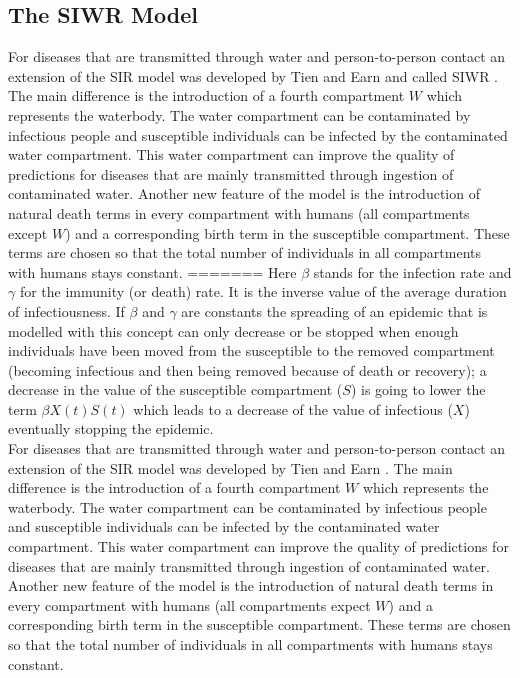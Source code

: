 \documentclass[11pt]{article}
\begin{document}
\subsection{The SIWR Model}
For diseases that are transmitted through water and person-to-person contact an extension of the SIR model was developed by Tien and Earn and called SIWR \cite{tien:2010}. The main difference is the introduction of a fourth compartment $ W $ which represents the waterbody. The water compartment can be contaminated by infectious people and susceptible individuals can be infected by the contaminated water compartment. This water compartment can improve the quality of predictions for diseases that are mainly transmitted through ingestion of contaminated water. Another new feature of the model is the introduction of natural death terms in every compartment with humans (all compartments except $ W $) and a corresponding birth term in the susceptible compartment. These terms are chosen so that the total number of individuals in all compartments with humans stays constant.
=======
Here $\beta$ stands for the infection rate and $\gamma$ for the immunity (or death) rate. It is the inverse value of the average duration of infectiousness. If $\beta$ and $\gamma$ are constants the spreading of an epidemic that is modelled with this concept can only decrease or be stopped when enough individuals have been moved from the susceptible to the removed compartment (becoming infectious and then being removed because of death or recovery); a decrease in the value of the susceptible compartment ($ S $) is going to lower the term $\beta X(t)S(t)$ which leads to a decrease of the value of infectious ($ X $) eventually stopping the epidemic.\\
For diseases that are transmitted through water and person-to-person contact an extension of the SIR model was developed by Tien and Earn \cite{tien:2010}. The main difference is the introduction of a fourth compartment $ W $ which represents the waterbody. The water compartment can be contaminated by infectious people and susceptible individuals can be infected by the contaminated water compartment. This water compartment can improve the quality of predictions for diseases that are mainly transmitted through ingestion of contaminated water. Another new feature of the model is the introduction of natural death terms in every compartment with humans (all compartments expect $ W $) and a corresponding birth term in the susceptible compartment. These terms are chosen so that the total number of individuals in all compartments with humans stays constant.
\end{document}
